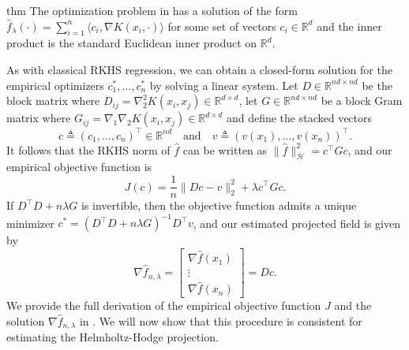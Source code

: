 \documentclass[11pt]{article}
\begin{document}
\begin{restatable}{thm}{} \label{gradient representer thm}
    The optimization problem in  has a solution of the form $\hat f_\lambda (\cdot) = \sum_{i = 1}^n\langle c_i, \nabla K(x_i, \cdot) \rangle$ for some set of vectors $c_{i} \in \mathbb{R}^d$ and the inner product is the standard Euclidean inner product on $\mathbb{R}^d$. 
\end{restatable}


As with classical RKHS regression, we can obtain a closed-form solution for the empirical optimizers $c_1^*, \dots, c_n^*$ by solving a linear system. Let $D \in \mathbb{R}^{nd \times nd}$ be the block matrix where $D_{ij} = \nabla_2^2K(x_i, x_j) \in \mathbb{R}^{d\times d}$, let $G \in \mathbb{R}^{nd \times nd}$ be a block Gram matrix where $G_{ij} = \nabla_1 \nabla_2 K(x_i, x_j) \in \mathbb{R}^{d\times d}$ and define the stacked vectors 
\[c \triangleq (c_1, \dots, c_n)^{\top} \in \mathbb{R}^{nd} \quad \text{and} \quad v \triangleq (v(x_1), \dots, v(x_n))^{\top}.\]
It follows that the RKHS norm of $\hat f$ can be written as $\|\hat f\|_\mathcal{H}^2 = c^{\top}Gc$, and our empirical objective function is 
\[J(c) = \frac{1}{n}\|Dc - v\|_2^2 + \lambda c^{\top}Gc.\]
If $D^\top D + n\lambda G$ is invertible, then the objective function admits a unique minimizer $c^* = (D^\top D + n\lambda G)^{-1}D^{\top}v$, and our estimated projected field is given by 
\[\nabla \hat f_{n, \lambda} = \begin{bmatrix}
    \nabla \hat f(x_1) \\
    \vdots \\
    \nabla \hat f(x_n)
\end{bmatrix} = Dc.\]
We provide the full derivation of the empirical objective function $J$ and the solution $\nabla \hat f_{n, \lambda}$ in . We will now show that this procedure is consistent for estimating the Helmholtz-Hodge projection.
\end{document}
